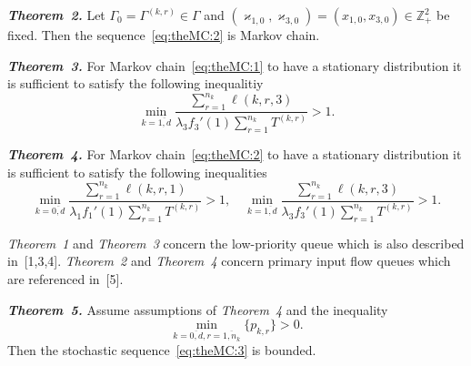\textit{\textbf{Theorem~2.}} 
Let $\Gamma_0=\Gamma^{(k,r)}\in \Gamma$ and $(\varkappa_{1,0}, \varkappa_{3,0})=(x_{1,0}, x_{3,0})\in \mathbb{Z}_+^2$ be fixed. Then the sequence~\eqref{eq:theMC:2} is Markov chain.


\textit{\textbf{Theorem~3.}} 
For Markov chain~\eqref{eq:theMC:1} to have a stationary distribution it is sufficient to satisfy the following inequalitiy
\begin{equation*}
\min_{k=\overline{1,d}} { \frac{\sum_{r = 1}^{n_k} \ell(k,r,3) }{\lambda_3 f_3'(1) \sum_{r=1}^{n_k} T^{(k,r)} }}>1.
\label{sufficient:double}
\end{equation*}


\textit{\textbf{Theorem~4.}} 
For Markov chain~\eqref{eq:theMC:2} to have a stationary distribution it is sufficient to satisfy the following inequalities
\begin{equation*}
\min_{k=\overline{0,d}} { \frac{\sum_{r = 1}^{n_k} \ell(k,r,1) }{\lambda_1 f_1'(1) \sum_{r=1}^{n_k} T^{(k,r)} }}>1, \quad 
\min_{k=\overline{1,d}} { \frac{\sum_{r = 1}^{n_k} \ell(k,r,3) }{\lambda_3 f_3'(1) \sum_{r=1}^{n_k} T^{(k,r)} }}>1.
\label{sufficient:double}
\end{equation*}


\textit{Theorem~1} and \textit{Theorem~3} concern the low-priority queue which
is also described in~[1,3,4]. \textit{Theorem~2} and \textit{Theorem~4} concern
primary input flow queues which are referenced in~[5].

\textit{\textbf{Theorem~5.}} 
Assume assumptions of  \textit{Theorem~4} and the inequality 
\begin{equation*}
    \min_{k=\overline{0,d}, r=\overline{1,n_k}} {\{p_{k,r}\}} > 0.
\end{equation*}
Then the stochastic sequence~\eqref{eq:theMC:3} is bounded.

